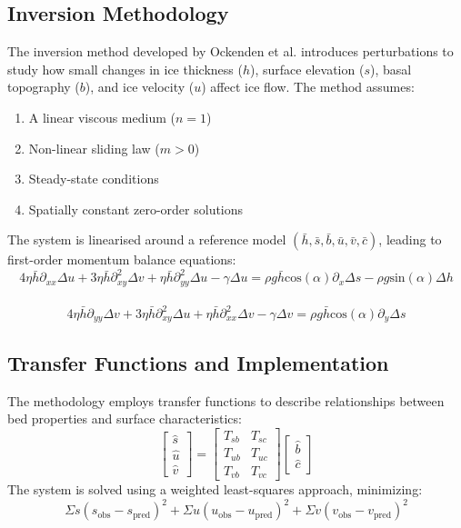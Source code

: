 \subsection*{Inversion Methodology}

The inversion method developed by Ockenden et al. introduces perturbations to study how small changes in ice thickness ($h$), surface elevation ($s$), basal topography ($b$), and ice velocity ($u$) affect ice flow. The method assumes:
\begin{enumerate}
\item A linear viscous medium ($n=1$)
\item Non-linear sliding law ($m>0$)
\item Steady-state conditions
\item Spatially constant zero-order solutions
\end{enumerate}

The system is linearised around a reference model $(\bar{h}, \bar{s}, \bar{b}, \bar{u}, \bar{v}, \bar{c})$, leading to first-order momentum balance equations:
\begin{equation}
4 \eta \bar{h} \partial_{xx} \Delta u + 3 \eta \bar{h} \partial_{xy}^{2} \Delta v + \eta \bar{h} \partial_{yy}^{2}\Delta u -\gamma \Delta u  = \rho g \bar{h}\mathrm{cos}(\alpha) \partial_x \Delta s - \rho g \mathrm{sin}(\alpha)\Delta h
\end{equation}\\
\begin{equation}
4 \eta \bar{h} \partial_{yy} \Delta v + 3 \eta \bar{h} \partial_{xy}^{2} \Delta u + \eta \bar{h} \partial_{xx}^{2}\Delta v -\gamma \Delta v  = \rho g \bar{h}\mathrm{cos}(\alpha) \partial_y \Delta s
\end{equation}

\subsection*{Transfer Functions and Implementation}

The methodology employs transfer functions to describe relationships between bed properties and surface characteristics:
$$\begin{bmatrix}
\hat{s} \\
\hat{u} \\
\hat{v}
\end{bmatrix} =\begin{bmatrix}
T_{sb} & T_{sc} \\
T_{ub} & T_{uc} \\
T_{vb} & T_{vc}
\end{bmatrix}
\begin{bmatrix}
\hat{b}\\
\hat{c}
\end{bmatrix}$$
The system is solved using a weighted least-squares approach, minimizing:
\begin{equation}
\Sigma s(s_{\mathrm{obs}} - s_{\mathrm{pred}})^2 + \Sigma u(u_{\mathrm{obs}} - u_{\mathrm{pred}})^2 + \Sigma v(v_{\mathrm{obs}} - v_{\mathrm{pred}})^2
\end{equation}


